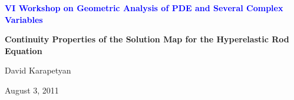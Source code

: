 \documentclass[a0,portrait]{a0poster}
\begin{document}
\begin{center}

      \fontsize{76}{1}\textbf{\textcolor{blue}{VI Workshop on Geometric Analysis of PDE and Several Complex Variables}}


 \end{center}

 \vspace{1.0cm}

 \begin{center}

      \fontsize{66}{1}\textbf{{Continuity Properties of the Solution Map for the Hyperelastic Rod Equation}}

 
 \end{center}

 \vspace{1.0cm}

 \begin{center}

    \begin{center}
     {\huge  David Karapetyan} 
    \end{center}

 \end{center}
\vspace{1.0cm}
 

    \begin{center}
     {\large August 3, 2011}
    \end{center}
 

   \vspace{1.8cm}

   \setlength{\columnsep}{2.5cm}  
   
\end{document}
